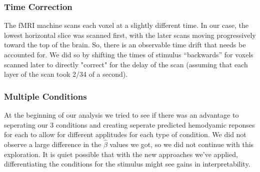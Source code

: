 \subsubsection{Time Correction}

The fMRI machine scans each voxel at a slightly different time. In our case, 
the lowest horizontal slice was scanned first, with the later scans moving 
progressively toward the top of the brain. So, there is an observable time drift 
that needs be accounted for. We did so by shifting the times of stimulus 
``backwards'' for voxels scanned later to directly "correct" for the delay of the 
scan (assuming that each layer of the scan took 2/34 of a second).

\subsubsection{Multiple Conditions}

At the beginning of our analysis we tried to see if there was an advantage to 
seperating our 3 conditions and creating seperate predicted hemodyamic reponses 
for each to allow for different applitudes for each type of condition. We did 
not observe a large difference in the $\hat{\beta}$ values we got, so we did not 
continue with this exploration. It is quiet possible that with the new approaches 
we've applied, differentiating the conditions for the stimulus might see gains in 
interpretability.


